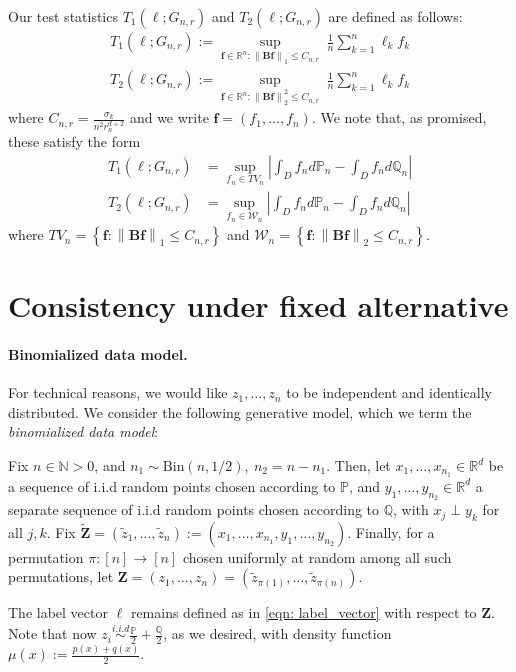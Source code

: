 \documentclass{article}
\newcommand{\Reals}{\mathbb{R}}
\newcommand{\norm}[1]{\left\lVert#1\right\rVert}
\newcommand{\abs}[1]{\left \lvert #1 \right \rvert}
\newcommand{\Bin}{\mathrm{Bin}}
\newcommand{\set}[1]{\left\{#1\right\}}
\newcommand{\Naturals}{\mathbb{N}}
\newcommand{\Rd}{\Reals^d}
\newcommand{\Zbf}{\mathbf{Z}}
\newcommand{\Bbf}{\mathbf{B}}
\newcommand{\lbf}{\bm{\ell}}
\newcommand{\fbf}{\mathbf{f}}
\newcommand{\Wset}{\mathcal{W}}
\newcommand{\Pbb}{\mathbb{P}}
\newcommand{\Qbb}{\mathbb{Q}}
\newcommand{\1}{\mathbf{1}}
\theoremstyle{alden}
\theoremstyle{aldenthm}
\theoremstyle{remark}
\begin{document}
Our test statistics $T_1(\lbf; G_{n,r})$ and $T_2(\lbf; G_{n,r})$ are defined as follows:
\begin{align*}
	T_1(\lbf; G_{n,r}) := \sup_{\fbf \in \Reals^n: \norm{\Bbf \fbf}_1 \leq C_{n,r}} ~ \frac{1}{n} \sum_{k = 1}^{n} \ell_k f_k \\
	T_2(\lbf; G_{n,r}) := \sup_{\fbf \in \Reals^n: \norm{\Bbf \fbf}_2^2 \leq C_{n,r}} ~ \frac{1}{n} \sum_{k = 1}^{n} \ell_k f_k
\end{align*}
where $C_{n,r} = \frac{\sigma_k}{n^2 r_n^{d+2}}$ and we write $\fbf = (f_1,\ldots, f_n)$. We note that, as promised, these satisfy the form
\begin{align*}
T_1(\lbf; G_{n,r}) & = \sup_{f_n \in TV_n}\abs{\int_{D} f_n d\Pbb_n - \int_{D} f_n d\Qbb_n} \\
T_2(\lbf; G_{n,r}) & = \sup_{f_n \in \Wset_n}\abs{\int_{D} f_n d\Pbb_n - \int_{D} f_n d\Qbb_n}
\end{align*}
where $TV_n = \set{\fbf: \norm{\Bbf \fbf}_1 \leq C_{n,r}}$ and $\Wset_n = \set{\fbf: \norm{\Bbf \fbf}_2 \leq C_{n,r}}$.



\section{Consistency under fixed alternative}

\paragraph{Binomialized data model.}
For technical reasons, we would like $z_1, \ldots, z_n$ to be independent and identically distributed. We consider the following generative model, which we term the \emph{binomialized data model}: 

Fix $n \in \Naturals > 0$, and $n_1 \sim \Bin(n,1/2),~ n_2 = n - n_1$. Then, let $x_1, \ldots, x_{n_1} \in \Rd$ be a sequence of i.i.d random points chosen according to $\Pbb$, and $y_1, \ldots, y_{n_2} \in \Rd$ a separate sequence of i.i.d random points chosen according to $\Qbb$, with $x_j \perp y_k$ for all $j,k$. Fix $\widetilde{\Zbf} = (\widetilde{z}_1,\ldots,\widetilde{z}_n) := (x_1, \ldots, x_{n_1}, y_1, \ldots, y_{n_2})$.  Finally, for a permutation $\pi: [n] \to [n]$ chosen uniformly at random among all such permutations, let $\Zbf = (z_1,\ldots,z_n) =  (\widetilde{z}_{\pi(1)}, \ldots, \widetilde{z}_{\pi(n)})$. 

The label vector $\lbf$ remains defined as in \eqref{eqn: label_vector} with respect to $\Zbf$. Note that now $z_i \overset{i.i.d}{\sim} \frac{\Pbb}{2} + \frac{\Qbb}{2}$, as we desired, with density function $\mu(x) := \frac{p(x) + q(x)}{2}$.
\end{document}
